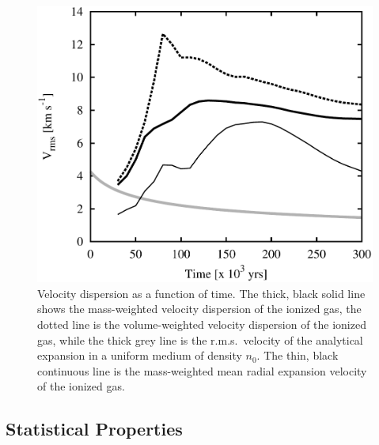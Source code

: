 \documentclass[useAMS,usenatbib]{mn2e}
\begin{document}
\begin{figure}
\centering
\includegraphics[width=\linewidth]{veldisp3}
\caption{Velocity dispersion as a function of time. The thick, black solid
  line shows the mass-weighted velocity dispersion of the ionized gas,
  the dotted line is the volume-weighted  velocity dispersion of the 
  ionized gas, while the thick grey line is the r.m.s.\ velocity of
  the analytical expansion \citep{1978Spitzer} in a uniform medium of
  density $n_0$. The thin, black continuous line is the 
  mass-weighted mean radial expansion velocity of the ionized gas.}
\label{fig:veldisp}
\end{figure}

\subsection{Statistical Properties}
\label{subsec:statprop}
\end{document}
